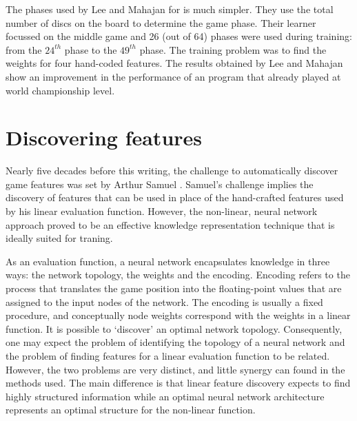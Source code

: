 The phases used by Lee and Mahajan \cite{lee:pattern} for   is much simpler. They use the total number of discs on the board to determine the game phase.  Their learner focussed on the middle game and 26 (out of 64) phases were used during training: from the $24^{th}$ phase to the $49^{th}$ phase.  The training problem was to find the weights for four hand-coded features. The results obtained by Lee and Mahajan show an improvement in the performance of an  program that already played at world championship level.
%
%

\section{Discovering features}
\label{sec:learning-features}
Nearly five decades before this writing, the challenge to automatically discover game features  was set by Arthur Samuel \cite{samuel:checkers}. Samuel's challenge implies the discovery of features that can be used in place of the hand-crafted features used by his linear evaluation function.  However, the non-linear, neural network approach proved to be an effective knowledge representation technique that is ideally suited for traning.  

As an evaluation function, a neural network encapsulates knowledge in three ways: the network topology, the weights and the encoding.  Encoding refers to the process that translates the game position into the floating-point values that are assigned to the input nodes of the network. The encoding is usually a fixed procedure, and conceptually node weights correspond with the weights in a linear function. It is possible to `discover' an optimal network topology. Consequently, one may expect the problem of identifying the topology of a neural network and the problem of finding features for a linear evaluation function to be related.  However, the two problems are very distinct, and little synergy can found in the methods used.  The main difference is that linear feature discovery expects to find highly structured information while an optimal neural network architecture represents an optimal structure for the non-linear function.  

